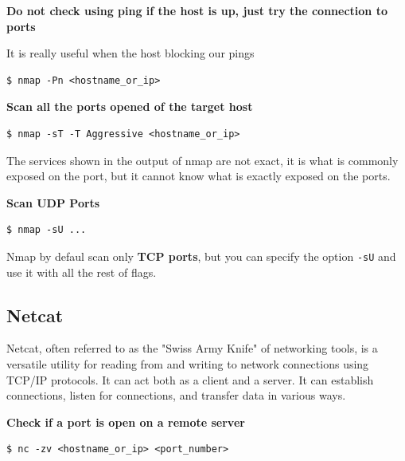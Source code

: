 \documentclass{article}
\newenvironment{blocktemplate}[1]{%
    \tcolorbox[beamer,%
    noparskip,breakable,
    colframe=Blue,%
    colbacklower=LimeGreen!75!LightGreen,%
    title=#1]}%
    {\endtcolorbox}
\newenvironment{blocktemplateII}[1]{%
    \tcolorbox[beamer,%
    noparskip,breakable,
    colframe=Green,%
    colbacklower=LimeGreen!75!LightGreen,%
    title=#1]}%
    {\endtcolorbox}
\newenvironment{codetemplate}[1][]{%
  \mybasecolorbox[#1]
  \itshape
}{%
  \endmybasecolorbox
}
\begin{document}
\textbf{Do not check using ping if the host is up, just try the connection to ports}

It is really useful when the host blocking our pings
\begin{codetemplate}{}
\begin{verbatim}
$ nmap -Pn <hostname_or_ip>
\end{verbatim}
\end{codetemplate}

\textbf{Scan all the ports opened of the target host}
\begin{codetemplate}{}
\begin{verbatim}
$ nmap -sT -T Aggressive <hostname_or_ip>
\end{verbatim}
\end{codetemplate}

\begin{blocktemplateII}{NOTE}
The services shown in the output of nmap are not exact, it is what is commonly exposed on the port, but it cannot know what is exactly exposed on the ports.
\end{blocktemplateII}

\textbf{Scan UDP Ports}
\begin{codetemplate}{}
\begin{verbatim}
$ nmap -sU ...
\end{verbatim}
\end{codetemplate}

\begin{blocktemplate}{NOTE}
Nmap by defaul scan only \textbf{TCP ports}, but you can specify the option \verb|-sU| and use it with all the rest of flags.
\end{blocktemplate}

\subsection{Netcat}
Netcat, often referred to as the "Swiss Army Knife" of networking tools, is a versatile utility for reading from and writing to network connections using TCP/IP protocols. It can act both as a client and a server. It can establish connections, listen for connections, and transfer data in various ways.

\textbf{Check if a port is open on a remote server}
\begin{codetemplate}
\begin{verbatim}
$ nc -zv <hostname_or_ip> <port_number>
\end{verbatim}
\end{codetemplate}
\end{document}
